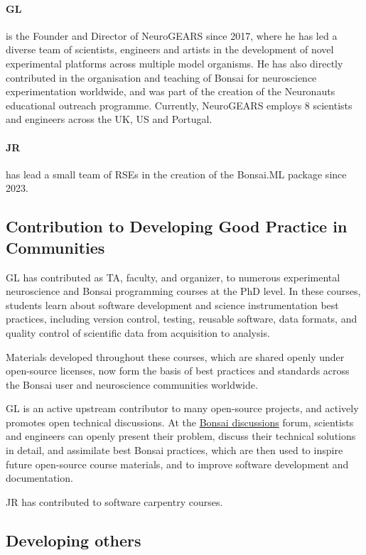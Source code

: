 \paragraph{GL} is the Founder and Director of NeuroGEARS since 2017, where he has led a diverse team of scientists, engineers and artists in the development of novel experimental platforms across multiple model organisms. He has also directly contributed in the organisation and teaching of Bonsai for neuroscience experimentation worldwide, and was part of the creation of the Neuronauts educational outreach programme. Currently, NeuroGEARS employs 8 scientists and engineers across the UK, US and Portugal.

\paragraph{JR} has lead a small team of RSEs in the
creation of the Bonsai.ML package since 2023.

\subsection{Contribution to Developing Good Practice in Communities}

GL has contributed as TA, faculty, and organizer, to numerous experimental neuroscience and Bonsai programming courses at the PhD level. In these courses, students learn about software development and science instrumentation best practices, including version control, testing, reusable software, data formats, and quality control of scientific data from acquisition to analysis.

Materials developed throughout these courses, which are shared openly under open-source licenses, now form the basis of best practices and standards across the Bonsai user and neuroscience communities worldwide.

GL is an active upstream contributor to many open-source projects, and actively promotes open technical discussions. At the \href{https://github.com/orgs/bonsai-rx/discussions}{Bonsai discussions} forum, scientists and engineers can openly present their problem, discuss their technical solutions in detail, and assimilate best
Bonsai practices, which are then used to inspire future open-source course materials, and to improve software development and documentation.

JR has contributed to software carpentry courses.


\subsection{Developing others}


